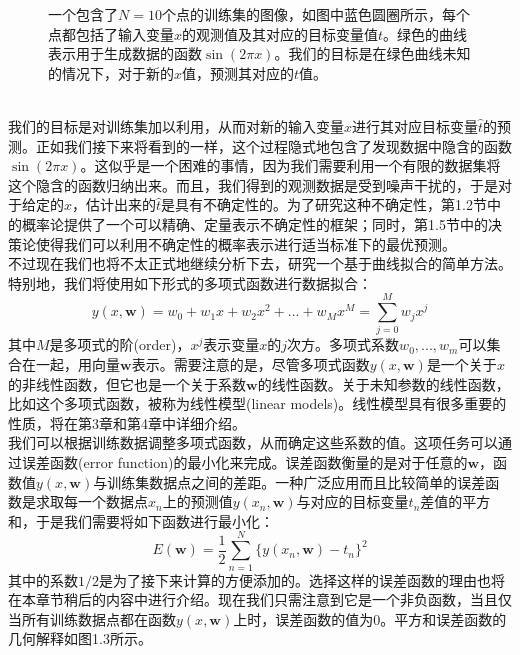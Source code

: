 \documentclass[b5paper]{book}
\numberwithin{equation}{chapter}
\begin{document}
{\begin{figure}[ht]
		\caption{一个包含了$N=10$个点的训练集的图像，如图中蓝色圆圈所示，每个点都包括了输入变量$x$的观测值及其对应的目标变量值$t$。绿色的曲线表示用于生成数据的函数$\sin (2 \pi x)$。我们的目标是在绿色曲线未知的情况下，对于新的$x$值，预测其对应的$t$值。} 
		\label{fig:1-2}	
	\end{figure}
	\\
	\indent 我们的目标是对训练集加以利用，从而对新的输入变量$\hat{x}$进行其对应目标变量$\hat{t}$的预测。正如我们接下来将看到的一样，这个过程隐式地包含了发现数据中隐含的函数$\sin (2 \pi x)$。这似乎是一个困难的事情，因为我们需要利用一个有限的数据集将这个隐含的函数归纳出来。而且，我们得到的观测数据是受到噪声干扰的，于是对于给定的$\hat x$，估计出来的$\hat t$是具有不确定性的。为了研究这种不确定性，第1.2节中的概率论提供了一个可以精确、定量表示不确定性的框架；同时，第1.5节中的决策论使得我们可以利用不确定性的概率表示进行适当标准下的最优预测。\\
	\indent 不过现在我们也将不太正式地继续分析下去，研究一个基于曲线拟合的简单方法。特别地，我们将使用如下形式的多项式函数进行数据拟合：
	\begin{equation}
		y(x,\mathbf{w})= w_0　+ w_1 x + w_2 x^2 + ... + w_M x^M = \sum_{j=0}^M w_j x^j
	\end{equation}
	其中$M$是多项式的阶(order)，$x^j$表示变量$x$的$j$次方。多项式系数$w_0,...,w_m$可以集合在一起，用向量$\mathbf{w}$表示。需要注意的是，尽管多项式函数$y(x,\mathbf{w})$是一个关于$x$的非线性函数，但它也是一个关于系数$\mathbf{w}$的线性函数。关于未知参数的线性函数，比如这个多项式函数，被称为线性模型(linear models)。线性模型具有很多重要的性质，将在第3章和第4章中详细介绍。\\
	\indent 我们可以根据训练数据调整多项式函数，从而确定这些系数的值。这项任务可以通过误差函数(error function)的最小化来完成。误差函数衡量的是对于任意的$\mathbf{w}$，函数值$y(x,\mathbf{w})$与训练集数据点之间的差距。一种广泛应用而且比较简单的误差函数是求取每一个数据点$x_n$上的预测值$y(x_n,\mathbf{w})$与对应的目标变量$t_n$差值的平方和，于是我们需要将如下函数进行最小化：
	\begin{equation}
	E(\mathbf{w}) = \frac{1}{2} \sum_{n=1}^N \{y(x_n,\mathbf{w}) - t_n\}^2
	\end{equation}
	其中的系数$1/2$是为了接下来计算的方便添加的。选择这样的误差函数的理由也将在本章节稍后的内容中进行介绍。现在我们只需注意到它是一个非负函数，当且仅当所有训练数据点都在函数$y(x,\mathbf{w})$上时，误差函数的值为0。平方和误差函数的几何解释如图1.3所示。
	\begin{figure}[ht]
		\centering

\end{figure}}
\end{document}
